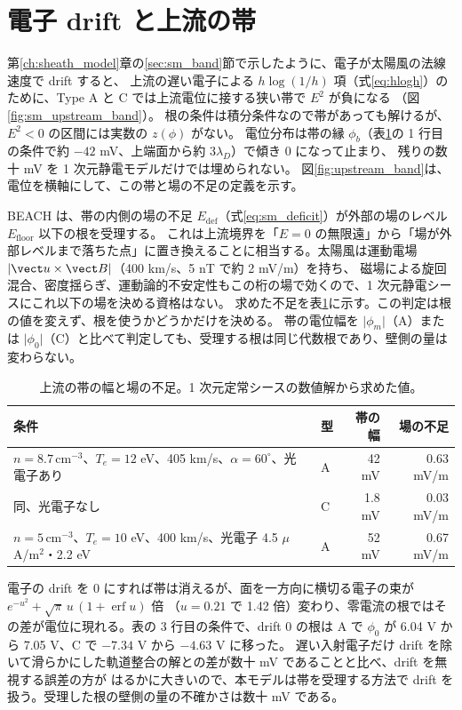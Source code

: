 \section{電子 drift と上流の帯}
\label{sec:upstream_band}
第\ref{ch:sheath_model}章の\ref{sec:sm_band}節で示したように、電子が太陽風の法線速度で drift すると、
上流の遅い電子による $h\log(1/h)$ 項（式\eqref{eq:hlogh}）のために、Type A と C では上流電位に接する狭い帯で $E^2$ が負になる
（図\ref{fig:sm_upstream_band}）。
根の条件は積分条件なので帯があっても解けるが、$E^2<0$ の区間には実数の $z(\phi)$ がない。
電位分布は帯の縁 $\phi_b$（表\ref{tab:band_deficit}の 1 行目の条件で約 $-42$ mV、上端面から約 $3\lambda_D$）で傾き 0 になって止まり、
残りの数十 mV を 1 次元静電モデルだけでは埋められない。
図\ref{fig:upstream_band}は、電位を横軸にして、この帯と場の不足の定義を示す。


BEACH は、帯の内側の場の不足 $E_{\mathrm{def}}$（式\eqref{eq:sm_deficit}）が外部の場のレベル $E_{\mathrm{floor}}$ 以下の根を受理する。
これは上流境界を「$E=0$ の無限遠」から「場が外部レベルまで落ちた点」に置き換えることに相当する。太陽風は運動電場 $\lvert\vect u\times\vect B\rvert$（400 km/s、5 nT で約 2 mV/m）を持ち、
磁場による旋回混合、密度揺らぎ、運動論的不安定性もこの桁の場で効くので、1 次元静電シースにこれ以下の場を決める資格はない。
求めた不足を表\ref{tab:band_deficit}に示す。この判定は根の値を変えず、根を使うかどうかだけを決める。
帯の電位幅を $\lvert\phi_m\rvert$（A）または $\lvert\phi_0\rvert$（C）と比べて判定しても、受理する根は同じ代数根であり、壁側の量は変わらない。

\begin{table}[htbp]
\centering
\caption{上流の帯の幅と場の不足。1 次元定常シースの数値解から求めた値。}
\label{tab:band_deficit}
\begin{tabular}{llrr}
\toprule
条件 & 型 & 帯の幅 & 場の不足 \\
\midrule
$n=8.7\,\mathrm{cm^{-3}}$、$T_e=12$ eV、405 km/s、$\alpha=60^\circ$、光電子あり & A & 42 mV & 0.63 mV/m \\
同、光電子なし & C & 1.8 mV & 0.03 mV/m \\
$n=5\,\mathrm{cm^{-3}}$、$T_e=10$ eV、400 km/s、光電子 4.5 $\mu$A/m$^2$・2.2 eV & A & 52 mV & 0.67 mV/m \\
\bottomrule
\end{tabular}
\end{table}

電子の drift を 0 にすれば帯は消えるが、面を一方向に横切る電子の束が $e^{-u^2}+\sqrt\pi\,u\,(1+\operatorname{erf}u)$ 倍
（$u=0.21$ で 1.42 倍）変わり、零電流の根ではその差が電位に現れる。表の 3 行目の条件で、drift 0 の根は A で
$\phi_0$ が 6.04 V から 7.05 V、C で $-7.34$ V から $-4.63$ V に移った。
遅い入射電子だけ drift を除いて滑らかにした軌道整合の解との差が数十 mV であることと比べ、drift を無視する誤差の方が
はるかに大きいので、本モデルは帯を受理する方法で drift を扱う。受理した根の壁側の量の不確かさは数十 mV である。

